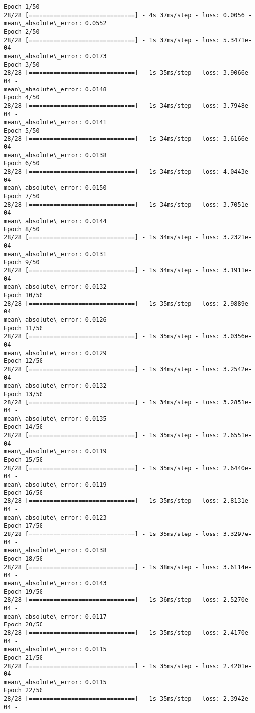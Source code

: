 \documentclass[11pt]{article}
\begin{document}
    \begin{Verbatim}[commandchars=\\\{\}]
Epoch 1/50
28/28 [==============================] - 4s 37ms/step - loss: 0.0056 -
mean\_absolute\_error: 0.0552
Epoch 2/50
28/28 [==============================] - 1s 37ms/step - loss: 5.3471e-04 -
mean\_absolute\_error: 0.0173
Epoch 3/50
28/28 [==============================] - 1s 35ms/step - loss: 3.9066e-04 -
mean\_absolute\_error: 0.0148
Epoch 4/50
28/28 [==============================] - 1s 34ms/step - loss: 3.7948e-04 -
mean\_absolute\_error: 0.0141
Epoch 5/50
28/28 [==============================] - 1s 34ms/step - loss: 3.6166e-04 -
mean\_absolute\_error: 0.0138
Epoch 6/50
28/28 [==============================] - 1s 34ms/step - loss: 4.0443e-04 -
mean\_absolute\_error: 0.0150
Epoch 7/50
28/28 [==============================] - 1s 34ms/step - loss: 3.7051e-04 -
mean\_absolute\_error: 0.0144
Epoch 8/50
28/28 [==============================] - 1s 34ms/step - loss: 3.2321e-04 -
mean\_absolute\_error: 0.0131
Epoch 9/50
28/28 [==============================] - 1s 34ms/step - loss: 3.1911e-04 -
mean\_absolute\_error: 0.0132
Epoch 10/50
28/28 [==============================] - 1s 35ms/step - loss: 2.9889e-04 -
mean\_absolute\_error: 0.0126
Epoch 11/50
28/28 [==============================] - 1s 35ms/step - loss: 3.0356e-04 -
mean\_absolute\_error: 0.0129
Epoch 12/50
28/28 [==============================] - 1s 34ms/step - loss: 3.2542e-04 -
mean\_absolute\_error: 0.0132
Epoch 13/50
28/28 [==============================] - 1s 34ms/step - loss: 3.2851e-04 -
mean\_absolute\_error: 0.0135
Epoch 14/50
28/28 [==============================] - 1s 35ms/step - loss: 2.6551e-04 -
mean\_absolute\_error: 0.0119
Epoch 15/50
28/28 [==============================] - 1s 35ms/step - loss: 2.6440e-04 -
mean\_absolute\_error: 0.0119
Epoch 16/50
28/28 [==============================] - 1s 35ms/step - loss: 2.8131e-04 -
mean\_absolute\_error: 0.0123
Epoch 17/50
28/28 [==============================] - 1s 35ms/step - loss: 3.3297e-04 -
mean\_absolute\_error: 0.0138
Epoch 18/50
28/28 [==============================] - 1s 38ms/step - loss: 3.6114e-04 -
mean\_absolute\_error: 0.0143
Epoch 19/50
28/28 [==============================] - 1s 36ms/step - loss: 2.5270e-04 -
mean\_absolute\_error: 0.0117
Epoch 20/50
28/28 [==============================] - 1s 35ms/step - loss: 2.4170e-04 -
mean\_absolute\_error: 0.0115
Epoch 21/50
28/28 [==============================] - 1s 35ms/step - loss: 2.4201e-04 -
mean\_absolute\_error: 0.0115
Epoch 22/50
28/28 [==============================] - 1s 35ms/step - loss: 2.3942e-04 -

\end{Verbatim}
\end{document}
